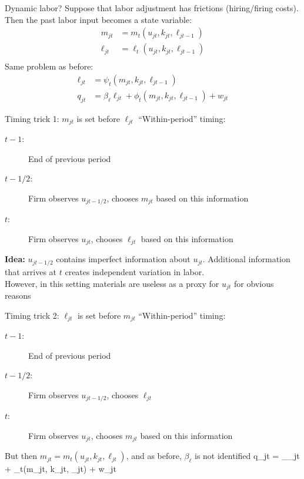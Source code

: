 \begin{frame}{Dynamic labor?}
	Suppose that labor adjustment has frictions (hiring/firing costs). Then the past labor input becomes a state variable:
	\begin{align*}
		m_{jt} &= m_t(u_{jt}, k_{jt}, \ell_{jt-1})\\
		\ell_{jt} &= \ell_t(u_{jt}, k_{jt}, \ell_{jt-1})\\
	\end{align*}
	Same problem as before:
		\begin{align*}
			\ell_{jt} &= \psi_t(m_{jt}, k_{jt}, \ell_{jt-1})\\
			q_{jt} &= \beta_\ell\ell_{jt} + \phi_t(m_{jt}, k_{jt}, \ell_{jt-1}) + w_{jt}
		\end{align*}	
\end{frame}

\begin{frame}{Timing trick 1: $m_{jt}$ is set before $\ell_{jt}$}
	``Within-period'' timing:
	\begin{description}
		\item[$t-1$:]{End of previous period}
		\item[$t-1/2:$]{Firm observes $u_{jt-1/2}$, chooses $m_{jt}$ based on this information}
		\item[$t$:]{Firm observes $u_{jt}$, chooses $\ell_{jt}$ based on this information}
	\end{description}
	\textbf{Idea:} $u_{jt-1/2}$ contains imperfect information about $u_{jt}$. Additional information that arrives at $t$ creates independent variation in labor.\\\bigskip
	However, in this setting materials are useless as a proxy for $u_{jt}$ for obvious reasons
\end{frame}

\begin{frame}{Timing trick 2: $\ell_{jt}$ is set before $m_{jt}$}
	``Within-period'' timing:
	\begin{description}
		\item[$t-1$:]{End of previous period}
		\item[$t-1/2:$]{Firm observes $u_{jt-1/2}$, chooses $\ell_{jt}$}
		\item[$t$:]{Firm observes $u_{jt}$, chooses $m_{jt}$ based on this information}
	\end{description}
	But then $m_{jt} = m_t(u_{jt}, k_{jt}, \ell_{jt})$, and as before, $\beta_\ell$ is not identified
	\be
			q_{jt} = \beta_\ell\ell_{jt} + \phi_t(m_{jt}, k_{jt}, \ell_{jt}) + w_{jt}
	\ee
\end{frame}

